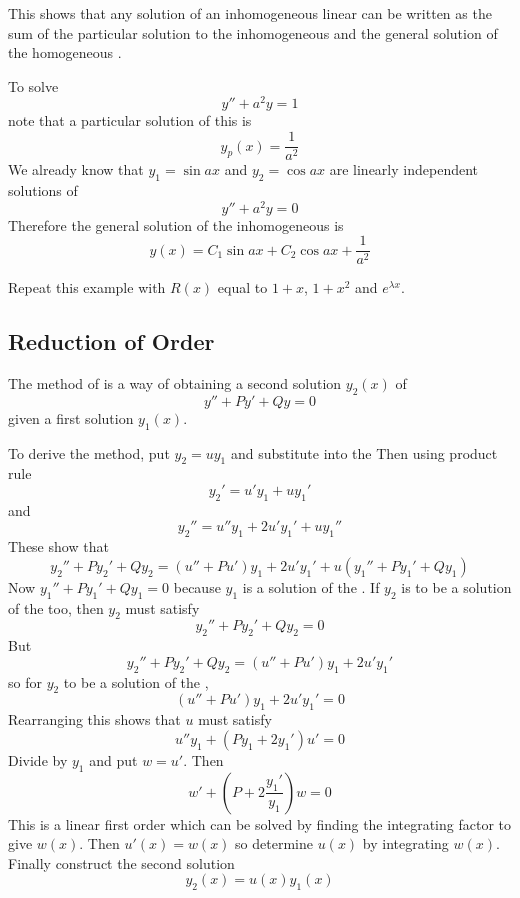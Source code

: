 This shows that any solution of an inhomogeneous linear \ODE can be written 
as the sum of the particular solution to the inhomogeneous \ODE and the
general solution of the homogeneous \ODE.

\begin{example}
To solve
$$y''+a^2y=1$$
note that a particular solution of this \ODE is
$$y_p(x)=\frac{1}{a^2}$$
We already know that $y_1=\sin ax$ and $y_2=\cos ax$ are linearly
independent solutions of
$$y''+a^2y=0$$
Therefore the general solution of the inhomogeneous \ODE is
$$y(x)=C_1\sin ax + C_2\cos ax + \frac{1}{a^2}$$
\end{example}


\begin{exercise}
Repeat this example with $R(x)$ equal to $1+x$, $1+x^2$ and $e^{\lambda x}$.
\end{exercise}

\subsection{Reduction of Order}

The method of  is a way of obtaining a second 
solution $y_2(x)$ of 
$$y''+Py'+Qy=0$$
given a first solution $y_1(x)$.

To derive the method, put $y_2=uy_1$ and substitute into the \ODE
Then using product rule
$$y_2'=u'y_1+uy_1'$$
and
$$y_2''=u''y_1+2u'y_1'+uy_1''$$
These show that
$$y_2''+Py_2'+Qy_2=(u''+Pu')y_1+2u'y_1'+u(y_1''+Py_1'+Qy_1)$$
Now $y_1''+Py_1'+Qy_1=0$ because $y_1$ is a solution of the \ODE.  If
$y_2$ is to be a solution of the \ODE too, then $y_2$ must satisfy
$$y_2''+Py_2'+Qy_2=0$$
But
$$y_2''+Py_2'+Qy_2=(u''+Pu')y_1+2u'y_1'$$
so for $y_2$ to be a solution of the \ODE, 
$$(u''+Pu')y_1+2u'y_1'=0$$
Rearranging this shows that $u$ must satisfy
$$u''y_1+(Py_1+2y_1')u'=0$$
Divide by $y_1$ and put $w=u'$.  Then
$$w'+\left(P+2\frac{y_1'}{y_1}\right)w=0$$
This is a linear first order \ODE which can be solved by finding the
integrating factor to give $w(x)$.  Then $u'(x)=w(x)$ so determine $u(x)$ by
integrating $w(x)$.  Finally construct the second solution
$$y_2(x)=u(x)y_1(x)$$

